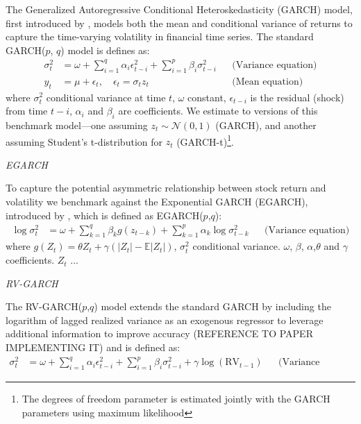 The Generalized Autoregressive Conditional Heteroskedasticity (GARCH) model, first introduced by \textcite{bollerslev1986garch}, models both the mean and conditional variance of returns to capture the time-varying volatility in financial time series. The standard GARCH($p$, $q$) model is defines as:
\begin{equation}
    \begin{aligned}
         \sigma_t^2 &= \omega + \sum_{i=1}^{q} \alpha_i \epsilon_{t-i}^2 + \sum_{i=1}^{p} \beta_i \sigma_{t-i}^2 &&\text{(Variance equation)} \\
         y_t &= \mu + \epsilon_t, \quad \epsilon_t = \sigma_t z_t &&\text{(Mean equation)} 
    \end{aligned}
\end{equation}
where $\sigma_t^2$ conditional variance at time $t$, $\omega$ constant, $\epsilon_{t-i}$ is the residual (shock) from time $t - i$, $\alpha_i$ and $\beta_i$ are coefficients. We estimate to versions of this benchmark model—one assuming $z_t \sim \mathcal{N}(0,1)$ (GARCH), and another assuming Student's t-distribution for $z_t$ (GARCH-t)\footnote{The degrees of freedom parameter is estimated jointly with the GARCH parameters using maximum likelihood}.  

\textit{EGARCH}

To capture the potential asymmetric relationship between stock return and volatility we benchmark against the Exponential GARCH (EGARCH), introduced by \textcite{Nelson1991egarch}, which is defined as EGARCH($p$,$q$): 
\begin{equation}
    \begin{aligned}
    \log \sigma_t^2 &= \omega + \sum_{k=1}^{q} \beta_k g(z_{t-k}) + \sum_{k=1}^{p} \alpha_k \log \sigma_{t-k}^2 &&\text{(Variance equation)}
    \end{aligned}
\end{equation}
where $g(Z_t) = \theta Z_t + \gamma \left( |Z_t| - \mathbb{E}|Z_t| \right)$, $\sigma_t^2$ conditional variance. $\omega$, $\beta$, $\alpha$,$\theta$ and $\gamma$ coefficients. $Z_t$ ...

\textit{RV-GARCH}

The RV-GARCH($p$,$q$) model extends the standard GARCH by including the logarithm of lagged realized variance as an exogenous regressor to leverage additional information to improve accuracy (REFERENCE TO PAPER IMPLEMENTING IT) and is defined as: 
\begin{equation}
    \begin{aligned}
         \sigma_t^2 &= \omega + \sum_{i=1}^{q} \alpha_i \epsilon_{t-i}^2 + \sum_{i=1}^{p} \beta_i \sigma_{t-i}^2 + \gamma \log(\text{RV}_{t-1}) &&\text{(Variance equation)}
    \end{aligned}
\end{equation}

